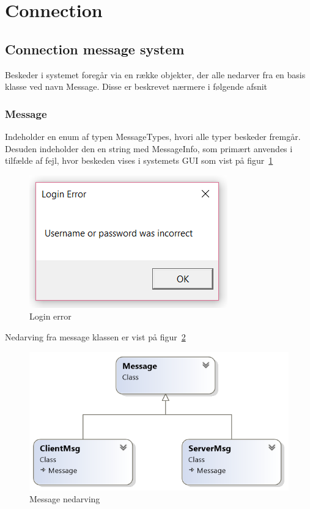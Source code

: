 \section{Connection}

\subsection{Connection message system}

Beskeder i systemet foregår via en række objekter, der alle nedarver fra en basis klasse ved navn Message. Disse er beskrevet nærmere i følgende afsnit

\subsubsection{Message}
Indeholder en enum af typen MessageTypes, hvori alle typer beskeder fremgår. Desuden indeholder den en string med MessageInfo, som primært anvendes i tilfælde af fejl, hvor beskeden vises i systemets GUI som vist på figur~\ref{fig:loginError}

\begin{figure}
	\centering
	\includegraphics[width=0.7\linewidth]{figs/connection/loginError.png}
	\caption{Login error}
	\label{fig:loginError}
\end{figure}

Nedarving fra message klassen er vist på figur~\ref{fig:MessageUML}

\begin{figure}
	\centering
	\includegraphics[width=0.7\linewidth]{figs/connection/MessageUML.png}
	\caption{Message nedarving}
	\label{fig:MessageUML}
\end{figure}

